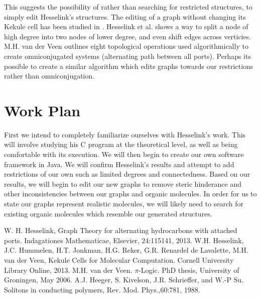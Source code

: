 \documentclass[12pt]{article}
\begin{document}
This suggests the possibility of rather than searching for restricted structures, to simply edit Hesselink's structures. The editing of a graph without changing its Kekule cell has been studied in \cite{H13,HH13,v06}. Hesselink et al. \cite{HH13} shows a way to split a node of high degree into two nodes of lower degree, and even shift edges across verticies. M.H. van der Veen \cite{v06} outlines eight topological operations used algorithmically to create omniconjugated systems (alternating path between all ports). Perhaps its possible to create a similar algorithm which edits graphs towards our restrictions rather than omniconjugation.
	
\section{Work Plan}

First we intend to completely familiarize ourselves with Hesselink's work. This will involve studying his C program at the theoretical level, as well as being comfortable with its execution. We will then begin to create our own software framework in Java. We will confirm Hesselink's results and attempt to add restrictions of our own such as limited degrees and connectedness. 
Based on our results, we will begin to edit our new graphs to remove steric hinderance and other inconsistencies between our graphs and organic molecules. In order for us to state our graphs represent realistic molecules, we will likely need to search for existing organic molecules which resemble our generated structures.


\begin{thebibliography}{abrv}

 W. H. Hesselink, Graph Theory for alternating hydrocarbons with attached ports. Indagationes Mathematicae, Elsevier, 24:115141, 2013.
 W.H. Hesselink, J.C. Hummelen, H.T. Jonkman, H.G. Reker, G.R. Renardel de Lavalette, M.H. van der Veen, Kekule Cells for Molecular Computation. Cornell University Library Online, 2013.
 M.H. van der Veen. $\pi$-Logic. PhD thesis, University of Groningen, May 2006.
 A.J. Heeger, S. Kivelson, J.R. Schrieffer, and W.-P Su. Solitons in conducting polymers, Rev. Mod. Phys.,60:781, 1988.

\end{thebibliography}
\end{document}
